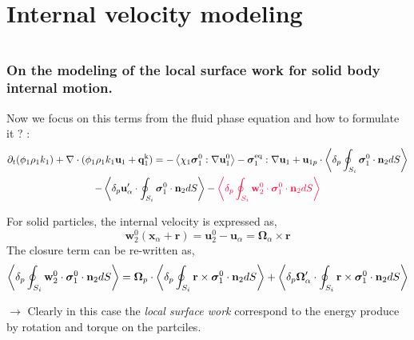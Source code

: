 \documentclass{sintefbeamer}
\begin{document}
\section{Internal velocity modeling}
\section*{}

\begin{frame}
  \frametitle{On the modeling of the local surface work for solid body internal motion. }
Now we focus on \textcolor{carminered}{this} terms from the fluid phase equation and how to formulate it ? :
  \begin{multline*}
    \pddt (\phi_1\rho_1k_1)  
      + \div (
          \phi_1\rho_1k_1\textbf{u}_1
          + \textbf{q}_1^\text{k} 
          )
      = 
      - \avg{\chi_1\bm{\sigma}_1^0 : \grad \textbf{u}_1^0}
      - \bm{\sigma}_1^\text{eq} : \grad \textbf{u}_1
      + \textbf{u}_{1p}\cdot \pSavg{{\bm{\sigma}_1^0 \cdot \textbf{n}_2}} \\
      - \pavg{ \textbf{u}_\alpha' \cdot \intS{  \bm{\sigma}_1^0 \cdot \textbf{n}_2}}
      - \textcolor{carminered}{\pavg{ \intS{\textbf{w}_2^0 \cdot \bm{\sigma}_1^0 \cdot \textbf{n}_2}} }
  \end{multline*}

  For solid particles, the internal velocity is expressed as,  
  \begin{equation*}
    \textbf{w}_2^0(\textbf{x}_\alpha + \textbf{r})
    = \textbf{u}_2^0 -  \textbf{u}_\alpha
    =
    \bm\Omega_\alpha \times \textbf{r}
  \end{equation*}
  The closure term can be re-written as, 
  \begin{multline*}
    \left<\delta_p  \oint_{S_{i}} \textbf{w}_2^0 \cdot \bm{\sigma}_1^0 \cdot \textbf{n}_2 dS\right>
    = 
    \bm\Omega_p \cdot \left<\delta_p  \oint_{S_{i}} \textbf{r} \times \bm{\sigma}_1^0 \cdot \textbf{n}_2 dS\right>
    + \left<\delta_p  \bm\Omega_\alpha'\cdot \oint_{S_{i}} \textbf{r} \times \bm{\sigma}_1^0 \cdot \textbf{n}_2 dS\right>
  \end{multline*}

  $\to $ Clearly in this case the \textit{local surface work} correspond to the energy produce by rotation and torque on the partciles. 


\end{frame}
\end{document}
